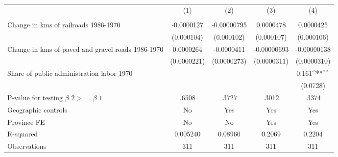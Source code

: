 {
\def\sym#1{\ifmmode^{#1}\else\(^{#1}\)\fi}
\begin{tabular}{l*{4}{c}}
\hline\hline
                &\multicolumn{1}{c}{(1)}&\multicolumn{1}{c}{(2)}&\multicolumn{1}{c}{(3)}&\multicolumn{1}{c}{(4)}\\
                &\multicolumn{1}{c}{}&\multicolumn{1}{c}{}&\multicolumn{1}{c}{}&\multicolumn{1}{c}{}\\
\hline
Change in kms of railroads 1986-1970&-0.0000127         &-0.00000795         &0.0000478         &0.0000425         \\
                &(0.000104)         &(0.000102)         &(0.000107)         &(0.000106)         \\
[1em]
Change in kms of paved and gravel roads 1986-1970&0.0000264         &-0.0000411         &-0.00000693         &-0.00000138         \\
                &(0.0000221)         &(0.0000273)         &(0.0000311)         &(0.0000310)         \\
[1em]
Share of public administration labor 1970&                  &                  &                  &    0.161\sym{**} \\
                &                  &                  &                  & (0.0728)         \\
\hline
P-value for testing $\beta\_{2} >= \beta\_{1}$&    .6508         &    .3727         &    .3012         &    .3374         \\
Geographic controls&       No         &      Yes         &      Yes         &      Yes         \\
Province FE     &       No         &       No         &      Yes         &      Yes         \\
R-squared       & 0.005240         &  0.08960         &   0.2069         &   0.2204         \\
Observations    &      311         &      311         &      311         &      311         \\
\hline\hline
\end{tabular}
}
